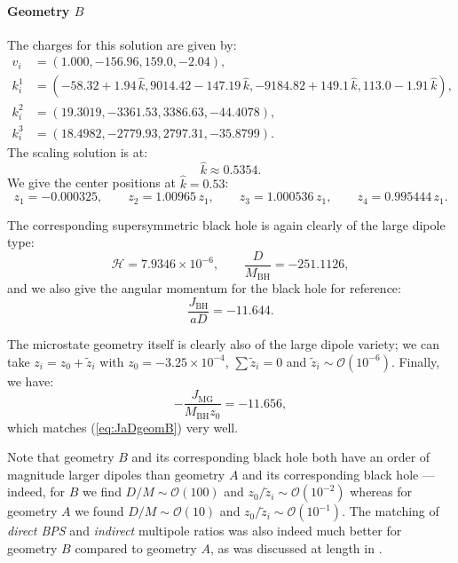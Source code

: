 \documentclass[12pt,a4paper]{article}
\newcommand{\be}{\begin{equation}}
\newcommand{\ee}{\end{equation}}
\def\indirect{\emph{indirect} }
\def\direct{\emph{direct BPS} }
\begin{document}
\paragraph{Geometry \texorpdfstring{$B$}{B}}
The charges for this solution are given by:
\be \begin{aligned}
 v_i &= \left(1.000, -156.96, 159.0, -2.04 \right),\\
   k_i^1 &= \left(-58.32 + 1.94\, \hat{k}, 9014.42 - 147.19 \, \hat{k}, -9184.82 + 
 149.1\, \hat{k}, 113.0 - 1.91\, \hat{k}\right),\\
   k_i^2 &= \left(19.3019,-3361.53,3386.63,-44.4078\right),\\
   k_i^3 &= \left(18.4982,-2779.93,2797.31,-35.8799\right).
\end{aligned}\ee
The scaling solution is at:
\be \hat{k} \approx 0.5354.\ee
We give the center positions at $\hat{k} = 0.53$:
\be z_1 = -0.000325, \qquad z_2 = 1.00965\, z_1, \qquad z_3 = 1.000536\, z_1, \qquad z_4 = 0.995444\, z_1.\ee

The corresponding supersymmetric black hole is again clearly of the large dipole type:
\be \mathcal{H} = 7.9346\times 10^{-6}, \qquad \frac{D}{M_\text{BH}} = -251.1126,\ee
and we also give the angular momentum for the black hole for reference:
\be \label{eq:JaDgeomB} \frac{J_\text{BH}}{aD} = -11.644.\ee

The microstate geometry itself is clearly also of the large dipole variety; we can take $z_i=z_0+\tilde z_i$ with $z_0 = -3.25\times 10^{-4}$,  $\sum\tilde z_i = 0$ and $\tilde z_i\sim \mathcal{O}(10^{-6})$.
%
Finally, we have:
\be -\frac{J_\text{MG}}{M_\text{BH} z_0} = -11.656,\ee
which matches (\ref{eq:JaDgeomB}) very well.

Note that geometry $B$ and its corresponding black hole both have an order of magnitude larger dipoles than geometry $A$ and its corresponding black hole --- indeed, for $B$ we find $D/M\sim \mathcal{O}(100)$ and $z_0/\tilde z_i\sim \mathcal{O}(10^{-2})$ whereas for geometry $A$ we found $D/M\sim \mathcal{O}(10)$ and $z_0/\tilde z_i\sim\mathcal{O}(10^{-1})$. The matching of \direct and \indirect multipole ratios was also indeed much better for geometry $B$ compared to geometry $A$, as was discussed at length in \cite{Bena:2020uup}.







\end{document}
